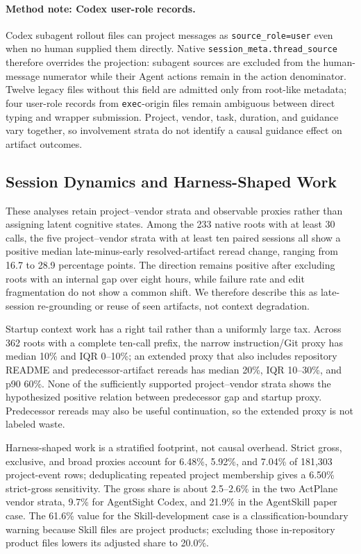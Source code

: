 \documentclass[letterpaper]{article}
\begin{document}
\paragraph{Method note: Codex user-role records.}
Codex subagent rollout files can project messages as \texttt{source\_role=user}
even when no human supplied them directly.  Native
\texttt{session\_meta.thread\_source} therefore overrides the projection:
subagent sources are excluded from the human-message numerator while their
Agent actions remain in the action denominator.  Twelve legacy files without
this field are admitted only from root-like metadata; four user-role records
from \texttt{exec}-origin files remain ambiguous between direct typing and
wrapper submission.  Project, vendor, task, duration, and guidance vary
together, so involvement strata do not identify a causal guidance effect on
artifact outcomes.

\subsection{Session Dynamics and Harness-Shaped Work}

These analyses retain project--vendor strata and observable proxies rather
than assigning latent cognitive states.  Among the 233 native roots with at
least 30 calls, the five project--vendor strata with at least ten paired
sessions all show a positive median late-minus-early resolved-artifact reread
change, ranging from 16.7 to 28.9 percentage points.  The direction remains
positive after excluding roots with an internal gap over eight hours, while
failure rate and edit fragmentation do not show a common shift.  We therefore
describe this as late-session re-grounding or reuse of seen artifacts, not
context degradation.

Startup context work has a right tail rather than a uniformly large tax.
Across 362 roots with a complete ten-call prefix, the narrow instruction/Git
proxy has median 10\% and IQR 0--10\%; an extended proxy that also includes
repository README and predecessor-artifact rereads has median 20\%, IQR
10--30\%, and p90 60\%.  None of the sufficiently supported project--vendor
strata shows the hypothesized positive relation between predecessor gap and
startup proxy.  Predecessor rereads may also be useful continuation, so the
extended proxy is not labeled waste.

Harness-shaped work is a stratified footprint, not causal overhead.  Strict
gross, exclusive, and broad proxies account for 6.48\%, 5.92\%, and 7.04\% of
181,303 project-event rows; deduplicating repeated project membership gives a
6.50\% strict-gross sensitivity.  The gross share is about 2.5--2.6\% in the
two ActPlane vendor strata, 9.7\% for AgentSight Codex, and 21.9\% in the
AgentSkill paper case.  The 61.6\% value for the Skill-development case is a
classification-boundary warning because Skill files are project products;
excluding those in-repository product files lowers its adjusted share to
20.0\%.
\end{document}
